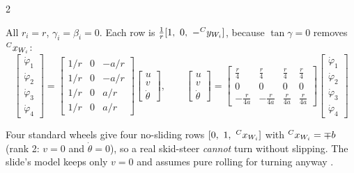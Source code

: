 \begin{multicols}{2}
\begin{fbx}
All $r_i=r$, $\gamma_i=\beta_i=0$. Each row is $\frac1r[1,\ 0,\ -{}^{C}y_{W_{i}}]$, because $\tan\gamma=0$ removes ${}^{C}x_{W_{i}}$:
\[\begin{bmatrix}\dot\varphi_1\\\dot\varphi_2\\\dot\varphi_3\\\dot\varphi_4\end{bmatrix}=\begin{bmatrix}1/r&0&-a/r\\1/r&0&-a/r\\1/r&0&a/r\\1/r&0&a/r\end{bmatrix}\begin{bmatrix}u\\v\\\dot\theta\end{bmatrix},\qquad
\begin{bmatrix}u\\v\\\dot\theta\end{bmatrix}=\begin{bmatrix}\frac r4&\frac r4&\frac r4&\frac r4\\0&0&0&0\\-\frac r{4a}&-\frac r{4a}&\frac r{4a}&\frac r{4a}\end{bmatrix}\begin{bmatrix}\dot\varphi_1\\\dot\varphi_2\\\dot\varphi_3\\\dot\varphi_4\end{bmatrix}\]
\end{fbx}
\begin{trap}
Four standard wheels give four no-sliding rows $[0,\ 1,\ {}^{C}x_{W_{i}}]$ with ${}^{C}x_{W_{i}}=\mp b$ (rank 2: $v=0$ and $\dot\theta=0$), so a real skid-steer \emph{cannot} turn without slipping. The slide's model keeps only $v=0$ and assumes pure rolling for turning anyway \added.
\end{trap}


\end{multicols}
